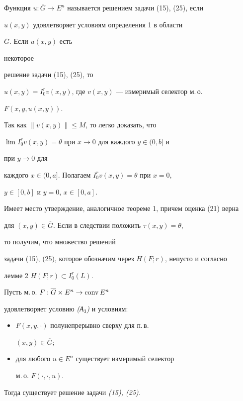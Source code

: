 Функция $u:\overline G\to E^n$ называется решением задачи (15), (25), если 


$u(x,y)$ удовлетворяет условиям определения 1 в области 


$\overline G$. Если $u(x,y)$ есть 


некоторое 


решение задачи (15), (25), то 


$u(x,y)=I_0^rv(x,y)$, где $v(x,y)$ --- измеримый селектор м.\,о. 


$F(x,y,u(x,y))$. 


Так как $\|v(x,y)\|\le M$, то легко доказать, что 


$\lim I_0^rv(x,y)=\theta$ при $x\to 0$ для каждого $y\in(0,b]$ и 


при $y\to 0$ для 


каждого $x\in(0,a]$. Полагаем $I_0^rv(x,y)=\theta$ при $x=0$, 


$y\in[0,b]$ и $y=0$, $x\in[0,a]$. 


 


Имеет место утверждение, аналогичное теореме 1, причем оценка (21) верна 


для $(x,y)\in\overline G$. Если в следствии положить $\tau(x,y)=\theta$, 


то получим, что множество решений 


задачи (15), (25), которое обозначим через $H(F;r)$, непусто и согласно 


лемме 2 $H(F;r)\subset I_0^r(L)$. 


 


\begin{thm} Пусть м.\,о. $F:\overline G\times E^n\to\operatorname{conv} E^n$ 


удовлетворяет условию {\em (А${}_3$)} и условиям: 


\begin{itemize} 


\item[(B${}_1$)] $F(x,y,\cdot)$ полунепрерывно сверху для п.\,в. 


$(x,y)\in\overline G$; 


\item[(B${}_2$)] для любого $u\in E^n$ существует измеримый селектор 


м.\,о. $F(\cdot,\cdot,u)$. 


\end{itemize} 


Тогда существует решение задачи {\em (15), (25).} 


\end{thm} 


